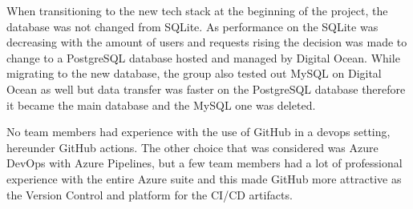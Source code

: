 When transitioning to the new tech stack at the beginning of the project, the database was not changed from SQLite. As performance on the SQLite was decreasing with the amount of users and requests rising the decision was made to change to a PostgreSQL database hosted and managed by Digital Ocean. While migrating to the new database, the group also tested out MySQL on Digital Ocean as well but data transfer was faster on the PostgreSQL database therefore it became the main database and the MySQL one was deleted.

No team members had experience with the use of GitHub in a devops setting, hereunder GitHub actions. The other choice that was considered was Azure DevOps with Azure Pipelines, but a few team members had a lot of professional experience with the entire Azure suite and this made GitHub more attractive as the Version Control and platform for the CI/CD artifacts.
